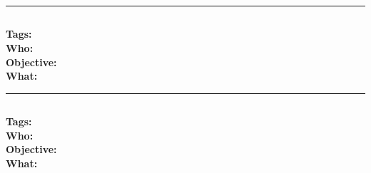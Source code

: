 \documentclass[11pt,a4paper]{article}
\begin{document}
\noindent\rule{\textwidth}{1pt}
\subsection*{\bibentry{}}
\textbf{Tags:}  \\
\textbf{Who:}  \\
\textbf{Objective:}  \\
\textbf{What:} 

\noindent\rule{\textwidth}{1pt}
\subsection*{\bibentry{}}
\textbf{Tags:}  \\
\textbf{Who:}  \\
\textbf{Objective:}  \\
\textbf{What:} 


\end{document}

